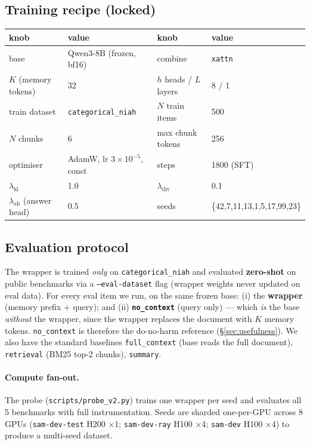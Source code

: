\documentclass[11pt]{article}
\newcommand{\noctx}{\texttt{no\_context}}
\newcommand{\fullctx}{\texttt{full\_context}}
\newcommand{\code}[1]{\texttt{#1}}
\begin{document}
\subsection{Training recipe (locked)}
\begin{center}\small
\begin{tabular}{llll}
\toprule
knob & value & knob & value\\
\midrule
base & Qwen3-8B (frozen, bf16) & combine & \code{xattn}\\
$K$ (memory tokens) & 32 & $h$ heads / $L$ layers & 8 / 1\\
train dataset & \code{categorical\_niah} & $N$ train items & 500\\
$N$ chunks & 6 & max chunk tokens & 256\\
optimiser & AdamW, lr $3\!\times\!10^{-5}$, const & steps & 1800 (SFT)\\
$\lambda_{\mathrm{kl}}$ & 1.0 & $\lambda_{\mathrm{div}}$ & 0.1\\
$\lambda_{\mathrm{ah}}$ (answer head) & 0.5 & seeds & \{42,7,11,13,1,5,17,99,23\}\\
\bottomrule
\end{tabular}
\end{center}

\subsection{Evaluation protocol}
The wrapper is trained \emph{only} on \code{categorical\_niah} and
evaluated \textbf{zero-shot} on public benchmarks via a
\code{--eval-dataset} flag (wrapper weights never updated on eval data).
For every eval item we run, on the same frozen base:
(i) the \textbf{wrapper} (memory prefix $+$ query); and
(ii) \textbf{\noctx{}} (query only) --- which \emph{is} the base
\emph{without} the wrapper, since the wrapper replaces the document with
$K$ memory tokens. \noctx{} is therefore the do-no-harm reference
(\S\ref{sec:usefulness}). We also have the standard baselines
\fullctx{} (base reads the full document), \code{retrieval} (BM25 top-2
chunks), \code{summary}.

\paragraph{Compute fan-out.} The probe (\code{scripts/probe\_v2.py})
trains one wrapper per seed and evaluates all 5 benchmarks with full
instrumentation. Seeds are sharded one-per-GPU across 8 GPUs
(\code{sam-dev-test} H200 $\times$1; \code{sam-dev-ray} H100 $\times$4;
\code{sam-dev} H100 $\times$4) to produce a multi-seed dataset.
\end{document}
